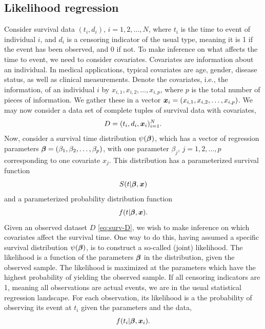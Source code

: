 \subsection{Likelihood regression}
Consider survival data $(t_i,d_i),\,i=1,2,\ldots,N$, where $t_i$ is the time to event of individual $i$, and $d_i$ is a censoring indicator of the usual type, meaning it is 1 if the event has been observed, and 0 if not.
To make inference on what affects the time to event, we need to consider covariates. Covariates are information about an individual. In medical applications, typical covariates are age, gender, disease status, as well as clinical measurements.
Denote the covariates, i.e., the information, of an individual $i$ by $x_{i,1},x_{i,2},\ldots,x_{i,p}$, where $p$ is the total number of pieces of information.
We gather these in a vector $\bm{x}_i=(x_{i,1},x_{i,2},\ldots,x_{i,p})$. We may now consider a data set of complete tuples of survival data with covariates,
\begin{equation}\label{eq:surv-D}
    D=(t_i,d_i,\bm{x}_i)_{i=1}^N.
\end{equation}
Now, consider a survival time distribution $\psi(\boldsymbol{\beta})$, which has a vector of regression parameters $\boldsymbol{\beta}=(\beta_1,\beta_2,\ldots,\beta_p)$, with one parameter $\beta_j,\,j=1,2,\ldots,p$ corresponding to one covariate $x_j$. This distribution has a parameterized survival function
\begin{equation*}
    S(t|\boldsymbol{\beta},\bm{x})
\end{equation*}
and a parameterized probability distribution function
\begin{equation*}
    f(t|\boldsymbol{\beta},\bm{x}).
\end{equation*}
Given an observed dataset $D$ \eqref{eq:surv-D}, we wish to make inference on which covariates affect the survival time.
One way to do this, having assumed a specific survival distribution $\psi(\boldsymbol{\beta})$, is to construct a so-called (joint) likelihood.
The likelihood is a function of the parameters $\boldsymbol{\beta}$ in the distribution, given the observed sample.
The likelihood is maximized at the parameters which have the highest probability of yielding the observed sample.
If all censoring indicators are 1, meaning all observations are actual events, we are in the usual statistical regression landscape.
For each observation, its likelihood is a the probability of observing its event at $t_i$ given the parameters and the data,
\begin{equation*}
    f(t_i|\boldsymbol{\beta},\bm{x}_i).
\end{equation*}
